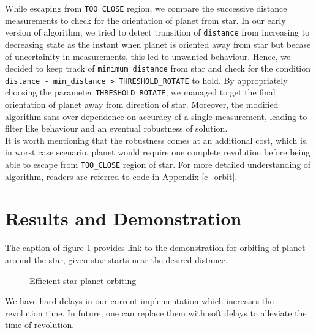 \documentclass{report}[12pt]
\begin{document}
While escaping from \texttt{TOO\_CLOSE} region, we compare the successive distance measurements to check for the orientation of planet from star. In our early version of algorithm, we tried to detect transition of \texttt{distance} from increasing to decreasing state as the instant when planet is oriented away from star but becase of uncertainity in measurements, this led to unwanted behaviour. Hence, we decided to keep track of \texttt{minimum\_distance} from star and check for the condition \texttt{distance - min\_distance > THRESHOLD\_ROTATE} to hold. By appropriately choosing the parameter \texttt{THRESHOLD\_ROTATE}, we managed to get the final orientation of planet away from direction of star. Moreover, the modified algorithm sans over-dependence on accuracy of a single measurement, leading to filter like behaviour and an eventual robustness of solution.\\
It is worth mentioning that the robustness comes at an additional cost, which is, in worst case scenario, planet would require one complete revolution before being able to escape from \texttt{TOO\_CLOSE} region of star. For more detailed understanding of algorithm, readers are referred to code in Appendix \ref{c_orbit}.


\section{Results and Demonstration}
The caption of figure \ref{fig:efficient_star_planet_orbiting} provides link to the demonstration for orbiting of planet around the star, given star starts near the desired distance.
\begin{figure}[H]
	\centering
	\caption{\href{https://youtu.be/LRgOzhAJI1k}{Efficient star-planet orbiting}}
	\label{fig:efficient_star_planet_orbiting}
\end{figure}
We have hard delays in our current implementation which increases the revolution time. In future, one can replace them with soft delays to alleviate the time of revolution.
\end{document}
